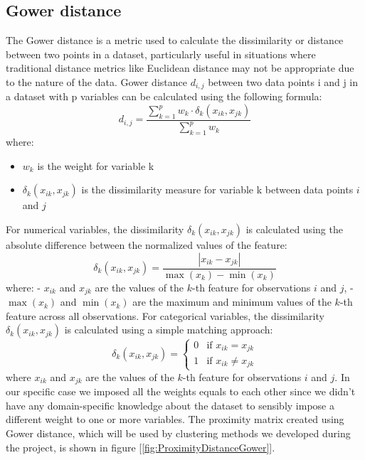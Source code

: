\documentclass[a4paper]{article}
\begin{document}
\subsection{Gower distance}
The Gower distance is a metric used to calculate the dissimilarity or distance between two points in a dataset, particularly useful in situations where traditional distance metrics like Euclidean distance may not be appropriate due to the nature of the data. Gower distance $d_{i,j}$ between two data points i and j in a dataset with p variables can be calculated using the following formula:
\begin{equation}
    d_{i,j} = \frac{ \sum_{k=1}^{p} w_k \cdot \delta_k(x_{ik}, x_{jk}) }{ \sum_{k=1}^p w_k }
\end{equation}
where:
\begin{itemize}
    \item $w_k$ is the weight for variable k
    \item $\delta_k(x_{ik}, x_{jk})$ is the dissimilarity measure for variable k between data points $i$ and $j$
\end{itemize}
For numerical variables, the dissimilarity $ \delta_k(x_{ik}, x_{jk}) $ is calculated using the absolute difference between the normalized values of the feature:
\begin{equation}
    \delta_k(x_{ik}, x_{jk}) = \frac{|x_{ik} - x_{jk}|}{\max(x_k) - \min(x_k)}
\end{equation}
where:
- $ x_{ik} $ and $ x_{jk} $ are the values of the $ k $-th feature for observations $ i $ and $ j $,
- $ \max(x_k) $ and $ \min(x_k) $ are the maximum and minimum values of the $ k $-th feature across all observations. \newline
For categorical variables, the dissimilarity $ \delta_k(x_{ik}, x_{jk}) $ is calculated using a simple matching approach:
\begin{equation}
    \delta_k(x_{ik}, x_{jk}) = 
    \begin{cases}
       0 & \text{if } x_{ik} = x_{jk} \\
       1 & \text{if } x_{ik} \ne x_{jk}
    \end{cases}
\end{equation}
where $ x_{ik} $ and $ x_{jk} $ are the values of the $ k $-th feature for observations $ i $ and $ j $. \newline
In our specific case we imposed all the weights equals to each other since we didn't have any domain-specific knowledge about the dataset to sensibly impose a different weight to one or more variables. The proximity matrix created using Gower distance, which will be used by clustering methods we developed during the project, is shown in figure [\ref{fig:ProximityDistanceGower}].
\end{document}
